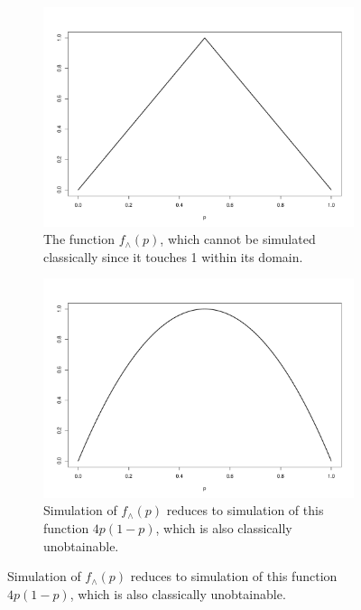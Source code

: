 \documentclass{article}
\theoremstyle{definition}
\begin{document}
\begin{figure} %
\centering
\begin{subfigure}{0.45\linewidth}
\centering
\includegraphics[width=\textwidth]{wedge_function.pdf}
\caption{The function $f_\wedge(p)$, which cannot be simulated classically since it touches 1 within its domain.}
\label{fig:wedge_fn}
\end{subfigure}%
\hfill
\begin{subfigure}{0.45\linewidth}
\centering
\includegraphics[width=\textwidth]{wedge_qbf_fn.pdf}
\caption{Simulation of $f_\wedge(p)$ reduces to simulation of this function $4p(1-p)$, which is also classically unobtainable.}
\label{fig:wedge_qbf_fn}
\end{subfigure}
\end{figure}
\end{document}
